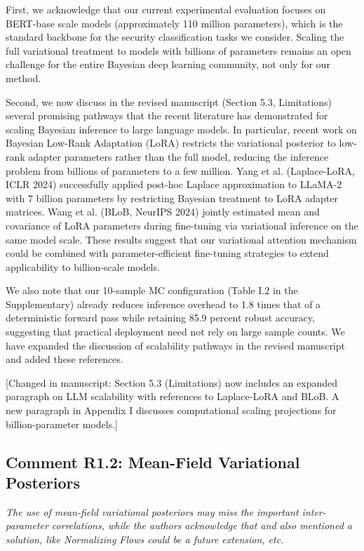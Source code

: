 \documentclass[12pt,a4paper]{article}
\newcommand{\reviewertext}[1]{\textcolor{reviewercolor}{\textit{#1}}}
\newcommand{\response}[1]{\textcolor{responsecolor}{#1}}
\newcommand{\changed}[1]{\textcolor{changecolor}{[Changed in manuscript: #1]}}
\begin{document}
\response{First, we acknowledge that our current experimental evaluation focuses on BERT-base scale models (approximately 110 million parameters), which is the standard backbone for the security classification tasks we consider. Scaling the full variational treatment to models with billions of parameters remains an open challenge for the entire Bayesian deep learning community, not only for our method.}

\response{Second, we now discuss in the revised manuscript (Section 5.3, Limitations) several promising pathways that the recent literature has demonstrated for scaling Bayesian inference to large language models. In particular, recent work on Bayesian Low-Rank Adaptation (LoRA) restricts the variational posterior to low-rank adapter parameters rather than the full model, reducing the inference problem from billions of parameters to a few million. Yang et al. (Laplace-LoRA, ICLR 2024) successfully applied post-hoc Laplace approximation to LLaMA-2 with 7 billion parameters by restricting Bayesian treatment to LoRA adapter matrices. Wang et al. (BLoB, NeurIPS 2024) jointly estimated mean and covariance of LoRA parameters during fine-tuning via variational inference on the same model scale. These results suggest that our variational attention mechanism could be combined with parameter-efficient fine-tuning strategies to extend applicability to billion-scale models.}

\response{We also note that our 10-sample MC configuration (Table I.2 in the Supplementary) already reduces inference overhead to 1.8 times that of a deterministic forward pass while retaining 85.9 percent robust accuracy, suggesting that practical deployment need not rely on large sample counts. We have expanded the discussion of scalability pathways in the revised manuscript and added these references.}

\changed{Section 5.3 (Limitations) now includes an expanded paragraph on LLM scalability with references to Laplace-LoRA and BLoB. A new paragraph in Appendix I discusses computational scaling projections for billion-parameter models.}

\bigskip

\subsection*{Comment R1.2: Mean-Field Variational Posteriors}

\reviewertext{The use of mean-field variational posteriors may miss the important inter-parameter correlations, while the authors acknowledge that and also mentioned a solution, like Normalizing Flows could be a future extension, etc.}
\end{document}
